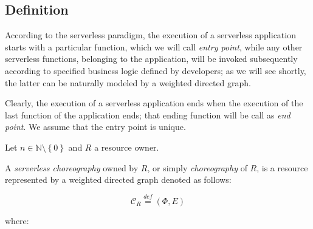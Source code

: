\documentclass[10pt,a4paper]{report}
\newcommand*{\N}{\mathbb{N}}
\newcommand{\mathDef}{\overset{\textit{def}}{=}}
\theoremstyle{definition}
\begin{document}
\subsection{Definition}

According to the serverless paradigm, the execution of a serverless application starts with a particular function, which we will call \textit{entry point}, while any other serverless functions, belonging to the application, will be invoked subsequently according to specified business logic defined by developers; as we will see shortly, the latter can be naturally modeled by a weighted directed graph.

Clearly, the execution of a serverless application ends when the execution of the last function of the application ends; that ending function will be call as \textit{end point}. We assume that the entry point is unique.

Let $n \in \N \setminus \left\lbrace 0 \right\rbrace $ and $R$ a resource owner.

A \textit{serverless choreography} owned by $R$, or simply \textit{choreography} of $R$, is a resource represented by a weighted directed graph denoted as follows:

\begin{equation}
	\mathcal{C}_R \mathDef (\Phi,E)
\end{equation}

where:
\end{document}
